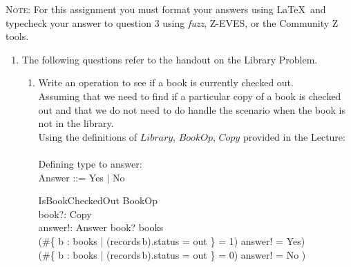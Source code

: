 \documentclass{article}
\begin{document}


\noindent \textsc{Note}: For this assignment you must format your
answers using \LaTeX\ and typecheck your answer to question 3 using {\em fuzz},  Z-EVES, or the Community Z tools.

\begin{enumerate}

\item The following questions refer to the handout on the Library Problem.
\begin{enumerate}
\item Write an operation to see if a book is currently checked out. \\
  \color{blue}
  Assuming that we need to find if a particular copy of a book is checked out and that
  we do not need to do handle the scenario when the book is not in the library.\\
  Using the definitions of $Library$, $BookOp$, $Copy$  provided in the Lecture: \\
  \\
  Defining type to answer: \\
  Answer ::= Yes $\mid$ No 
 \begin{schema}{IsBookCheckedOut}
   \Xi BookOp \\
   book?: Copy \\
   answer!: Answer
   \where
    book? \in books \\
    (\#\{ b : books | (records\,b).status = out \} = 1) \implies answer! = Yes) \land \\
    (\#\{ b : books | (records\,b).status = out \} = 0) \implies answer! = No ) 
   
\end{schema}
\color{black}
 

\end{enumerate}
\end{enumerate}
\end{document}
